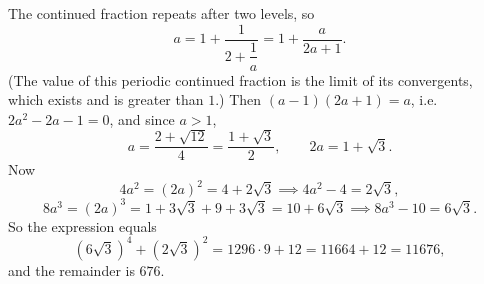 The continued fraction repeats after two levels, so
\[a=1+\dfrac{1}{2+\dfrac1a}=1+\dfrac{a}{2a+1}.\]
(The value of this periodic continued fraction is the limit of its convergents, which exists and is greater than $1$.) Then $(a-1)(2a+1)=a$, i.e. $2a^2-2a-1=0$, and since $a>1$,
\[a=\dfrac{2+\sqrt{12}}{4}=\dfrac{1+\sqrt3}{2},\qquad 2a=1+\sqrt3.\]
Now
\[4a^2=(2a)^2=4+2\sqrt3\implies4a^2-4=2\sqrt3,\]
\[8a^3=(2a)^3=1+3\sqrt3+9+3\sqrt3=10+6\sqrt3\implies8a^3-10=6\sqrt3.\]
So the expression equals
\[\left(6\sqrt3\right)^4+\left(2\sqrt3\right)^2=1296\cdot9+12=11664+12=11676,\]
and the remainder is $\boxed{676}$.
